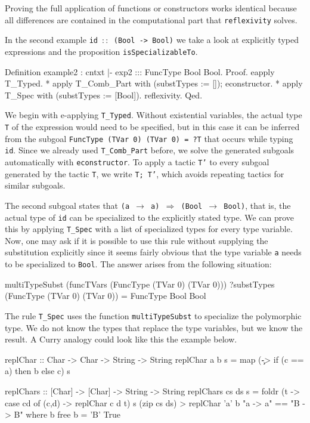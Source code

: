 \documentclass[paper = a4, fleqn, twoside]{scrreprt}
\begin{document}
Proving the full application of functions or constructors works identical because all differences are contained in the computational part that \texttt{reflexivity} solves.\\
\par\noindent
In the second example \texttt{id $::$ (Bool -> Bool)} we take a look at explicitly typed expressions and the proposition \texttt{isSpecializableTo}. 
\begin{coqcode}
Definition example2 : cntxt |- exp2 ::: FuncType Bool Bool.
Proof.
  eapply T_Typed.
    * apply T_Comb_Part with (substTypes := []);
      econstructor.
    * apply T_Spec with (substTypes := [Bool]).
      reflexivity.
Qed.
\end{coqcode}
We begin with e-applying \texttt{T\_Typed}. Without existential variables, the actual type \texttt{T} of the expression would need to be specified, but in this case it can be inferred from the subgoal \texttt{FuncType (TVar 0) (TVar 0) = ?T} that occurs while typing \texttt{id}. Since we already used \texttt{T\_Comb\_Part} before, we solve the generated subgoals automatically with \texttt{econstructor}. To apply a tactic \texttt{T'} to every subgoal generated by the tactic \texttt{T}, we write \texttt{T; T'}, which avoids repeating tactics for similar subgoals. 
\par
The second subgoal states that \texttt{(a $\rightarrow$ a) $\Rightarrow$ (Bool $\rightarrow$ Bool)}, that is, the actual type of \texttt{id} can be specialized to the explicitly stated type. We can prove this by applying \texttt{T\_Spec} with a list of specialized types for every type variable. Now, one may ask if it is possible to use this rule without supplying the substitution explicitly since it seems fairly obvious that the type variable \texttt{a} needs to be specialized to \texttt{Bool}. The answer arises from the following situation:
\begin{coqcode}
multiTypeSubst (funcTVars (FuncType (TVar 0) (TVar 0))) ?substTypes
(FuncType (TVar 0) (TVar 0)) = FuncType Bool Bool
\end{coqcode}
The rule \texttt{T\_Spec} uses the function \texttt{multiTypeSubst} to specialize the polymorphic type. We do not know the types that replace the type variables, but we know the result. A Curry analogy could look like this the example below.
\begin{haskellcode}
replChar :: Char -> Char -> String -> String
replChar a b s = map (\c -> if (c == a) then b else c) s

replChars :: [Char] -> [Char] -> String -> String
replChars cs ds s =  foldr (\cd t -> case cd of (c,d) -> replChar c d t)
                           s (zip cs ds)
> replChar 'a' b "a -> a" == "B -> B" where b free
{b = 'B'} True
\end{haskellcode}
\end{document}
